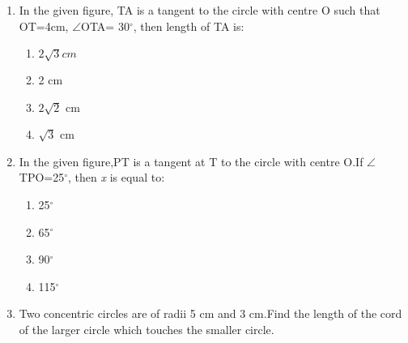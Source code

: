 \documentclass[12pt,A4 paper]{article}
\begin{document}
\begin{flushleft}
\begin{enumerate}
\item In the given figure, TA is a tangent to the circle with centre O such that OT=4cm, $\angle$OTA= 30$^{\circ}$, then length of TA is:
      \begin{enumerate}
          \item $2\sqrt3 cm$
          \item 2 cm
          \item $2\sqrt2$ cm
          \item $\sqrt3$ cm
      \end{enumerate}

\begin{flushright}
  \begin{figure}[h]
	\centering
	
  \end{figure}
\end{flushright}




\item In the given figure,PT is a tangent at T to the circle with centre O.If $\angle$TPO=25$^{\circ}$, then \textit{x} is equal to:
   \begin{enumerate}
       \item 25$^{\circ}$
       \item 65$^{\circ}$  
       \item 90$^{\circ}$
       \item 115$^{\circ}$
       
   \end{enumerate}


\begin{flushright}
\begin{figure}[h]
	        \centering
	        
\end{figure}
\end{flushright}

\item Two concentric circles are of radii 5 cm and 3 cm.Find the length of the cord of the larger circle which touches the smaller circle.\\

         
\end{enumerate}
\end{flushleft}
\end{document}
